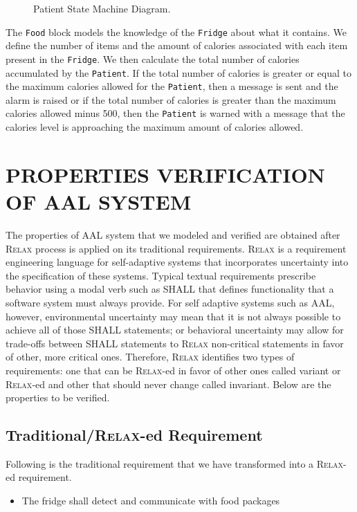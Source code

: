 \documentclass[a4paper,twoside]{article}
\def\myrelax{\textsc{Relax}}                  %
\begin{document}
\begin{figure}[!h]
  \centering
  {}
  \caption{Patient State Machine Diagram.}
  \label{fig:patientstm}
 \end{figure}
 
The \texttt{Food} block models the knowledge of the \texttt{Fridge} about what it contains. We define the number of items and the amount of calories associated with each item present in the \texttt{Fridge}. We then calculate the total number of calories accumulated by the \texttt{Patient}. If the total number of calories is greater or equal to the maximum calories allowed for the \texttt{Patient}, then a message is sent and the alarm is raised or if the total number of calories is greater than the maximum calories allowed minus 500, then the \texttt{Patient} is warned with a message that the calories level is approaching the maximum amount of calories allowed. 

\section{\uppercase{Properties Verification of AAL system}}
\label{sec:properties}
\noindent The properties of AAL system that we modeled and verified are obtained after \myrelax{} process is applied on its traditional requirements. \myrelax{}  is  a  requirement  engineering language for self-adaptive systems that incorporates uncertainty into the specification of these systems. Typical  textual  requirements  prescribe behavior  using  a  modal  verb  such  as  SHALL  that defines  functionality  that  a  software  system  must always provide. For self adaptive systems such as AAL, however, environmental  uncertainty  may  mean  that  it  is  not always  possible  to  achieve  all  of  those  SHALL statements; or behavioral uncertainty may allow for trade-offs between SHALL statements to \myrelax{} non-critical  statements  in  favor  of  other,  more  critical ones.  Therefore,  \myrelax{} identifies two types of requirements: one that can be \myrelax{}-ed in favor of other ones called variant or \myrelax{}-ed and other that should never change called invariant.
Below are the properties to be verified. 

\subsection{Traditional/\myrelax{}-ed Requirement}

Following is the traditional requirement that we have transformed into a \myrelax{}-ed requirement.
\begin{itemize}
\item The fridge shall detect and communicate with food packages
\end{itemize}
\end{document}
